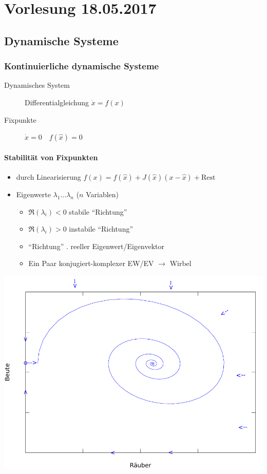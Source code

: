 \section{Vorlesung 18.05.2017}

\subsection{Dynamische Systeme} %

\subsubsection{Kontinuierliche dynamische Systeme}

\begin{description}
    \item[Dynamisches System] Differentialgleichung \quad $ \dot{x} = f(x) $
    \item[Fixpunkte] $ \dot{x} = 0 \quad f(\hat{x}) = 0 $
\end{description}

\paragraph{Stabilität von Fixpunkten}
\begin{itemize}
    \item durch Linearisierung $ f(x) = f(\hat{x}) + J(\hat{x}) (x - \hat{x}) + \text{Rest} $
    \item Eigenwerte $ \lambda_1 \dots \lambda_n $ \quad ($ n $ Variablen)
        \begin{itemize}
            \item $ \Re(\lambda_i) < 0 $ \quad stabile "`Richtung"'
            \item $ \Re(\lambda_i) > 0 $ \quad instabile "`Richtung"'
            \item "`Richtung"' . reeller Eigenwert/Eigenvektor
            \item Ein Paar konjugiert-komplexer EW/EV $ \rightarrow $ Wirbel
        \end{itemize}
\end{itemize}

\includegraphics[width=\textwidth]{lectures/170518/pix/trajektorie_1.pdf}

